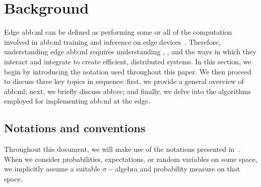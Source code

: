 \section{Background}\label{sec:background}

Edge \gls{abb:ml} can be defined as
performing some or all of the computation involved in \gls{abb:ml} training and inference on edge devices~\cite{singhEdgeAISurvey2023}.
Therefore, understanding edge \gls{abb:ml} requires understanding , , and the ways in which they interact and integrate to create efficient, distributed systems.
In this section, we begin by introducing the notation used throughout this paper.
We then proceed to discuss three key topics in sequence: first, we provide a general overview of \gls{abb:ml}; next, we briefly discuss \gls{abb:ec}; and finally, we delve into the algorithms employed for implementing \gls{abb:ml} at the edge.

\subsection{Notations and conventions}
\label{par:notations}

Throughout this document, we will make use of the notations presented in~.
When we consider probabilities, expectations, or random variables on some space,
we implicitly assume a suitable \(\sigma-\)algebra and probability measure on that space.

